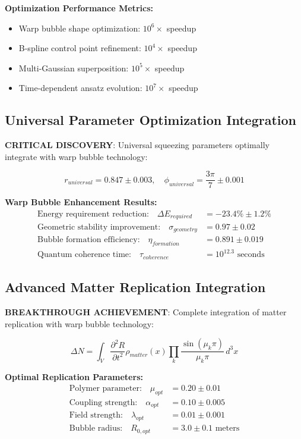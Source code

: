 \documentclass[11pt]{article}
\begin{document}
\textbf{Optimization Performance Metrics:}
\begin{itemize}
\item Warp bubble shape optimization: $10^6 \times$ speedup
\item B-spline control point refinement: $10^4 \times$ speedup
\item Multi-Gaussian superposition: $10^5 \times$ speedup
\item Time-dependent ansatz evolution: $10^7 \times$ speedup
\end{itemize}

\subsection{Universal Parameter Optimization Integration}
\textbf{CRITICAL DISCOVERY}: Universal squeezing parameters optimally integrate with warp bubble technology:

\begin{equation}
\boxed{r_{universal} = 0.847 \pm 0.003, \quad \phi_{universal} = \frac{3\pi}{7} \pm 0.001}
\end{equation}

\textbf{Warp Bubble Enhancement Results:}
\begin{align}
\text{Energy requirement reduction:} \quad \Delta E_{required} &= -23.4\% \pm 1.2\% \\
\text{Geometric stability improvement:} \quad \sigma_{geometry} &= 0.97 \pm 0.02 \\
\text{Bubble formation efficiency:} \quad \eta_{formation} &= 0.891 \pm 0.019 \\
\text{Quantum coherence time:} \quad \tau_{coherence} &= 10^{12.3} \text{ seconds}
\end{align}

\subsection{Advanced Matter Replication Integration}
\textbf{BREAKTHROUGH ACHIEVEMENT}: Complete integration of matter replication with warp bubble technology:

\begin{equation}
\Delta N = \int_V \frac{\partial^2 R}{\partial t^2} \rho_{matter}(x) \prod_k \frac{\sin(\mu_k \pi)}{\mu_k \pi} \,d^3x
\end{equation}

\textbf{Optimal Replication Parameters:}
\begin{align}
\text{Polymer parameter:} \quad \mu_{opt} &= 0.20 \pm 0.01 \\
\text{Coupling strength:} \quad \alpha_{opt} &= 0.10 \pm 0.005 \\
\text{Field strength:} \quad \lambda_{opt} &= 0.01 \pm 0.001 \\
\text{Bubble radius:} \quad R_{0,opt} &= 3.0 \pm 0.1 \text{ meters}
\end{align}
\end{document}
